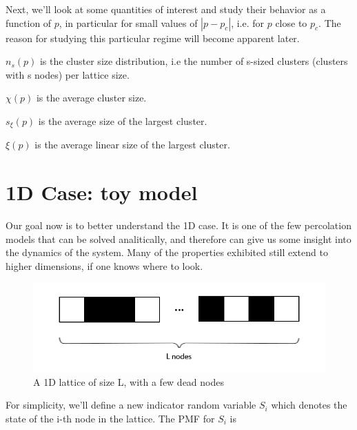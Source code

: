 Next, we'll look at some quantities of interest and study their behavior as a function of $p$, in particular for small values of $|p - p_c|$, i.e. for $p$ close to $p_c$. The reason for studying this particular regime will become apparent later.


\begin{defn}
	$n_{s}(p)$ is the cluster size distribution, i.e the number of s-sized clusters (clusters with s nodes) per lattice size.
\end{defn}

\begin{defn}
$\chi(p)$ is the average cluster size.
\end{defn}

\begin{defn}
	$s_{\xi}(p)$ is the average size of the largest cluster.
\end{defn}

\begin{defn}
$\xi(p)$ is the average linear size of the largest cluster.
\end{defn}



\section{1D Case: toy model}\label{sec:1d}

Our goal now is to better understand the 1D case. It is one of the few percolation models that can be solved analitically, and therefore can give us some insight into the dynamics of the system. Many of the properties exhibited still extend to higher dimensions, if one knows where to look.

\begin{figure}[h]
  \includegraphics[width=\linewidth]{Images/1dlattice.png}
  \caption{A 1D lattice of size L, with a few dead nodes}
  \label{fig:1dlattice}
\end{figure}

For simplicity, we'll define a new indicator random variable $S_i$ which denotes the state of the i-th node in the lattice. The PMF for $S_i$ is

